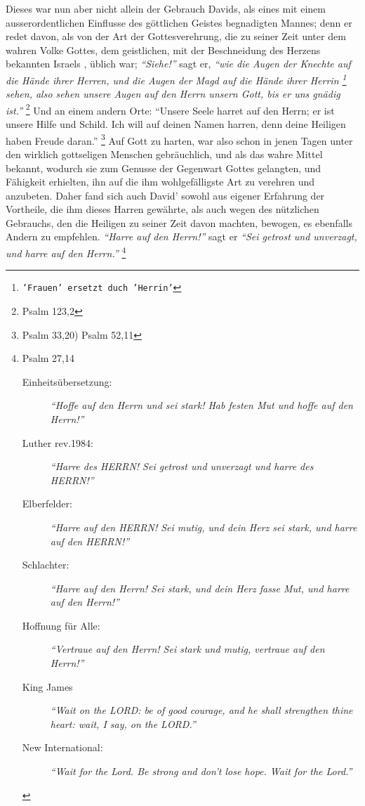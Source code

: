 \medskip

Dieses war nun aber nicht allein der Gebrauch Davids, als eines mit einem
ausserordentlichen Einflusse des göttlichen Geistes begnadigten Mannes; denn er
redet davon, als von der Art der Gottesverehrung, die zu seiner Zeit unter dem
wahren Volke Gottes, dem geistlichen, mit der
Beschneidung des Herzens  bekannten
Israels  , üblich war; \textit{"`Siehe!"'} sagt er,
\textit{"`wie die Augen der Knechte auf die
Hände ihrer Herren, und die Augen der Magd auf die Hände ihrer Herrin
\footnote{\texttt{'Frauen' ersetzt duch 'Herrin'}} sehen,
also sehen unsere Augen auf den Herrn unsern Gott, bis er uns gnädig
ist."'} 
\footnote{Psalm 123,2}
Und an einem andern Orte:
"`Unsere Seele harret auf den Herrn; er ist unsere Hilfe und Schild. Ich will
auf deinen Namen harren,
denn deine Heiligen haben Freude daran."'
\footnote{Psalm 33,20)  Psalm 52,11}
Auf Gott zu harten, war also schon in jenen Tagen unter den wirklich gottseligen
Menschen gebräuchlich, und als das wahre Mittel bekannt, wodurch sie zum Genusse
der Gegenwart Gottes  gelangten, und Fähigkeit
erhielten, ihn auf die ihm
wohlgefälligste Art zu verehren und anzubeten. Daher fand sich auch David'
sowohl aus eigener Erfahrung der Vortheile, die ihm
dieses Harren gewährte, als
auch wegen des nützlichen Gebrauchs, den die Heiligen zu seiner Zeit davon
machten, bewogen, es ebenfalls Andern zu empfehlen.
\textit{"`Harre auf den Herrn!"'}  sagt
er
\textit{"`Sei getrost und unverzagt, und harre auf den Herrn."'}
\footnote{Psalm 27,14
\begin{description}
 \item[Einheitsübersetzung:] \textit{"`Hoffe auf den Herrn und sei stark! Hab
festen Mut und hoffe auf den Herrn!"'}
 \item[Luther rev.1984:] \textit{"`Harre des HERRN! Sei getrost und unverzagt
und harre des HERRN!"'}
 \item[Elberfelder:] \textit{"`Harre auf den HERRN! Sei mutig, und dein Herz sei
stark, und harre auf den HERRN!"'}
 \item[Schlachter:] \textit{"`Harre auf den Herrn! Sei stark, und dein Herz
fasse Mut, und harre auf den Herrn!"'}
 \item[Hoffnung für Alle:] \textit{"`Vertraue auf den Herrn! Sei stark und
mutig, vertraue auf den Herrn!"'}
 \item[King James]
\textit{ "`Wait on the LORD: be of good courage, and he shall strengthen thine
heart: wait, I say, on the LORD."'}
 \item[New International:] \textit{ "`Wait for the Lord. Be strong and don't
lose hope. Wait for the Lord."'}
 \end{description}
}

